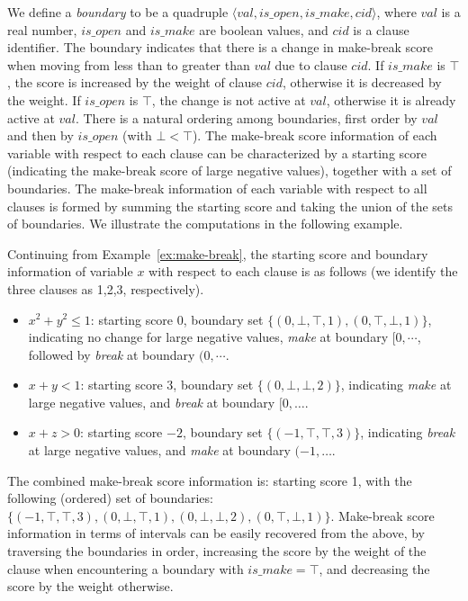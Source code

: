 \documentclass[runningheads]{llncs}
\begin{document}
We define a \emph{boundary} to be a quadruple $\langle \mathit{val}, \mathit{is\_open}, \mathit{is\_make}, \mathit{cid}\rangle$, where $\mathit{val}$ is a real number, $\mathit{is\_open}$ and $\mathit{is\_make}$ are boolean values, and $\mathit{cid}$ is a clause identifier. The boundary indicates that there is a change in make-break score when moving from less than to greater than $\mathit{val}$ due to clause $\mathit{cid}$. If $\mathit{is\_make}$ is $\top$, the score is increased by the weight of clause $\mathit{cid}$, otherwise it is decreased by the weight. If $\mathit{is\_open}$ is $\top$, the change is not active at $\mathit{val}$, otherwise it is already active at $\mathit{val}$. There is a natural ordering among boundaries, first order by $\mathit{val}$ and then by $\mathit{is\_open}$ (with $\bot<\top$). The make-break score information of each variable with respect to each clause can be characterized by a starting score (indicating the make-break score of large negative values), together with a set of boundaries. The make-break information of each variable with respect to all clauses is formed by summing the starting score and taking the union of the sets of boundaries. We illustrate the computations in the following example.

\begin{example}
\label{ex:boundaries}
    Continuing from Example~\ref{ex:make-break}, the starting score and boundary information of variable $x$ with respect to each clause is as follows (we identify the three clauses as 1,2,3, respectively).
    \begin{itemize}
        \item $x^2+y^2\le 1$: starting score 0, boundary set $\{(0,\bot,\top,1), (0,\top,\bot,1)\}$, indicating no change for large negative values, \emph{make} at boundary $[0,\cdots$, followed by \emph{break} at boundary $(0,\cdots$.
        \item $x+y<1$: starting score 3, boundary set $\{(0,\bot,\bot,2)\}$, indicating \emph{make} at large negative values, and \emph{break} at boundary $[0,\dots$.
        \item $x+z>0$: starting score $-2$, boundary set $\{(-1,\top,\top,3)\}$, indicating \emph{break} at large negative values, and \emph{make} at boundary $(-1,\dots$.
    \end{itemize}
    The combined make-break score information is: starting score 1, with the following (ordered) set of boundaries: $\{(-1,\top,\top,3),(0,\bot,\top,1),(0,\bot,\bot,2),(0,\top,\bot,1)\}$. Make-break score information in terms of intervals can be easily recovered from the above, by traversing the boundaries in order, increasing the score by the weight of the clause when encountering a boundary with $\mathit{is\_make}=\top$, and decreasing the score by the weight otherwise.
\end{example}
\end{document}
